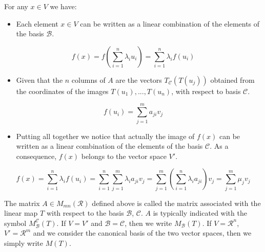For any $x \in V$ we have:
\begin{itemize}
	\item Each element $x \in V$ can be written as a linear combination of the elements
		of the basis $\mathcal{B}$.
\end{itemize}
\begin{equation*}
	f(x) = f(\sum_{i=1}^{n}\lambda_{i}u_{i}) = \sum_{i=1}^{n}\lambda_{i}f(u_{i})
\end{equation*}
\begin{itemize}
	\item Given that the $n$ columns of $A$ are the vectors $T_{\mathcal{C}}(T(u_{j}
		))$ obtained from the coordinates of the images $T(u_{1}),...,T(u_{n})$,
		with respect to basis $\mathcal{C}$.
\end{itemize}
\begin{equation*}
	f(u_{i}) = \sum_{j=1}^{m}a_{ji}v_{j}
\end{equation*}
\begin{itemize}
	\item Putting all together we notice that actually the image of $f(x)$ can be written
		as a linear combination of the elements of the basis $\mathcal{C}$. As a
		consequence, $f(x)$ belongs to the vector space $V'$.
\end{itemize}
\begin{equation*}
	f(x) = \sum_{i=1}^{n}\lambda_{i}f(u_{i}) = \sum_{i=1}^{n}\sum_{j=1}^{m}\lambda_{i}
	a_{ji}v_{j}= \sum_{j=1}^{m}(\sum_{i=1}^{n}\lambda_{i}a_{ji}) v_{j}= \sum_{j=1}^{m}
	\mu_{j}v_{j}
\end{equation*}

The matrix $A \in M_{mn}(\mathcal{R})$ defined above is called the matrix associated
with the linear map $T$ with respect to the basis $\mathcal{B}$, $\mathcal{C}$. $A$
is typically indicated with the symbol $M^{\mathcal{C}}_{\mathcal{B}}(T)$. If
$V=V'$ and $\mathcal{B}=\mathcal{C}$, then we write $M_{\mathcal{B}}(T)$. If
$V=\mathcal{R}^{n}$, $V'=\mathcal{R}^{m}$ and we consider the canonical basis of
the two vector spaces, then we simply write $M(T)$.

